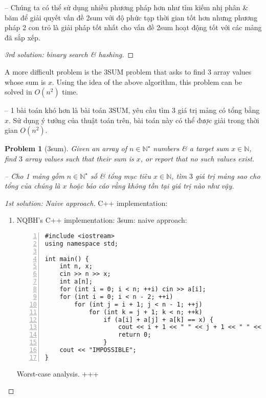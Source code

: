 \documentclass{article}
\newtheorem{problem}{Problem}
\begin{document}
-- Chúng ta có thể sử dụng nhiều phương pháp hơn như tìm kiếm nhị phân \& băm để giải quyết vấn đề {\sc2sum} với độ phức tạp thời gian tốt hơn nhưng phương pháp 2 con trỏ là giải pháp tốt nhất cho vấn đề {\sc2sum} hoạt động tốt với các mảng đã sắp xếp.

\begin{proof}[3rd solution: binary search \& hashing]

\end{proof}
A more difficult problem is the 3SUM problem that asks to find 3 array values whose sum is $x$. Using the idea of the above algorithm, this problem can be solved in $O(n^2)$ time.

-- 1 bài toán khó hơn là bài toán 3SUM, yêu cầu tìm 3 giá trị mảng có tổng bằng $x$. Sử dụng ý tưởng của thuật toán trên, bài toán này có thể được giải trong thời gian $O(n^2)$.

\begin{problem}[{\sc3sum}]
    Given an array of $n\in\mathbb{N}^\star$ numbers \& a target sum $x\in\mathbb{N}$, find $3$ array values such that their sum is $x$, or report that no such values exist.

    -- Cho 1 mảng gồm $n\in\mathbb{N}^\star$ số \& tổng mục tiêu $x\in\mathbb{N}$, tìm $3$ giá trị mảng sao cho tổng của chúng là $x$ hoặc báo cáo rằng không tồn tại giá trị nào như vậy.
\end{problem}

\begin{center}
\end{center}

\begin{proof}[1st solution: Naive approach]
    C++ implementation:
    \begin{enumerate}
        \item NQBH's C++ implementation: 3sum: naive approach:
        \begin{Verbatim}[numbers=left,xleftmargin=5mm]
#include <iostream>
using namespace std;

int main() {
    int n, x;
    cin >> n >> x;
    int a[n];
    for (int i = 0; i < n; ++i) cin >> a[i];
    for (int i = 0; i < n - 2; ++i)
        for (int j = i + 1; j < n - 1; ++j)
            for (int k = j + 1; k < n; ++k)
                if (a[i] + a[j] + a[k] == x) {
                    cout << i + 1 << " " << j + 1 << " " << k + 1;
                    return 0;
                }
    cout << "IMPOSSIBLE";
}
        \end{Verbatim}
        {\sf Worst-case analysis.} +++

    \end{enumerate}
\end{proof}
\end{document}
